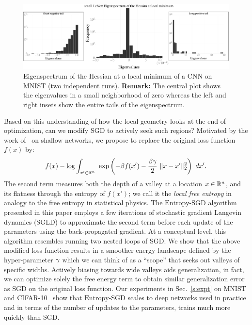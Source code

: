 \documentclass[10pt]{article}
\newcommand\red[1]{{\color{red}#1}}
\newcommand{\entropysgd}{\mathrm{Entropy}\textrm{-}\mathrm{SGD}}
\begin{document}
\begin{figure}[tbh]
\centering
\includegraphics[width=\textwidth]{lenet_hessian.pdf}
\caption{\small Eigenspectrum of the Hessian at a local minimum of a CNN on MNIST (two independent runs). \textbf{Remark:} The central plot shows the eigenvalues in a small neighborhood of zero whereas the left and right insets show the entire tails of the eigenspectrum.}
\label{fig:lenet_hessian}
\end{figure}

Based on this understanding of how the local geometry looks at the end of optimization, can we modify SGD to actively seek such regions? \red{Motivated by the work of~\citet{baldassi2015subdominant,baldassi2016unreasonable} on shallow networks,} we propose to replace the original loss function $f(x)$ by:
$$	
f(x) 
- \log \int_{x' \in \mathbb{R}^n}\ \exp \left(-\beta f(x') - \frac{\beta \gamma}{2}\ \lVert x-x'\rVert^2_2\right)\ dx'.
$$
The second term measures both the depth of a valley at a location  $x \in \mathbb{R}^n$, and its flatness through the entropy of $f(x')$;  \red{we call it the {\it local free entropy} in analogy to the free entropy in statistical physics.} The $\entropysgd$ algorithm presented in this paper employs a few iterations of stochastic gradient Langevin dynamics (SGLD) to approximate the second term before each update of the parameters using the back-propagated gradient. At a conceptual level, this algorithm resembles running two nested loops of SGD. We show that the above modified loss function results in a smoother energy landscape defined by the hyper-parameter $\gamma$ which we can think of as a ``scope'' that seeks out valleys of specific widths. Actively biasing towards wide valleys aids generalization, in fact, we can optimize solely the free energy term to obtain similar generalization error as SGD on the original loss function. Our experiments in Sec.~\ref{s:expt} on MNIST and CIFAR-10~\citep{krizhevsky2009learning} show that $\entropysgd$ scales to deep networks used in practice and in terms of the number of updates to the parameters, trains much more quickly than SGD.
\end{document}
